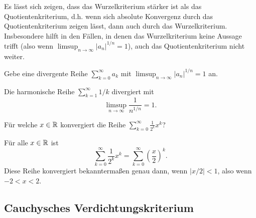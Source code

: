 \documentclass[a4paper,10pt]{article}
\begin{document}
\begin{bem}
 Es lässt sich zeigen, dass das Wurzelkriterium stärker ist als das Quotientenkriterium, d.h. wenn sich absolute Konvergenz durch das Quotientenkriterium zeigen lässt, dann auch durch das Wurzelkriterium. Insbesondere hilft in den Fällen, in denen das Wurzelkriterium keine Aussage trifft (also wenn $\limsup_{n \to \infty} |a_n|^{1/n} = 1$), auch das Quotientenkriterium nicht weiter.
\end{bem}


\begin{question}
 Gebe eine divergente Reihe $\sum_{k=0}^\infty a_k$ mit $\limsup_{n \to \infty} |a_n|^{1/n} = 1$ an.
\end{question}
\begin{solution}
 Die harmonische Reihe $\sum_{k=1}^\infty 1/k$ divergiert mit
 \[
  \limsup_{n \to \infty} \frac{1}{n^{1/n}} = 1.
 \]
\end{solution}


\begin{question}
 Für welche $x \in \mathbb{R}$ konvergiert die Reihe $\sum_{k=0}^\infty \frac{1}{2^k} x^k$?
\end{question}
\begin{solution}
 Für alle $x \in \mathbb{R}$ ist
 \[
  \sum_{k=0}^\infty \frac{1}{2^k} x^k
  = \sum_{k=0}^\infty \left(\frac{x}{2}\right)^k.
 \]
 Diese Reihe konvergiert bekanntermaßen genau dann, wenn $|x/2| < 1$, also wenn $-2 < x < 2$.
\end{solution}





\subsection{Cauchysches Verdichtungskriterium}
\end{document}
